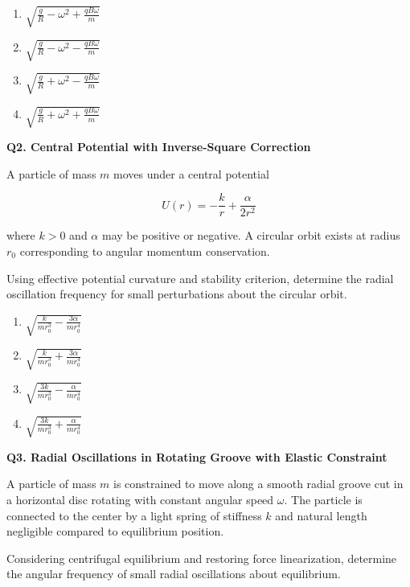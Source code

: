 \documentclass[12pt]{article}
\begin{document}
\begin{enumerate}
\item[(A)] $\sqrt{\frac{g}{R}-\omega^2+\frac{qB\omega}{m}}$
\item[(B)] $\sqrt{\frac{g}{R}-\omega^2-\frac{qB\omega}{m}}$
\item[(C)] $\sqrt{\frac{g}{R}+\omega^2-\frac{qB\omega}{m}}$
\item[(D)] $\sqrt{\frac{g}{R}+\omega^2+\frac{qB\omega}{m}}$
\end{enumerate}


\textbf{Q2. Central Potential with Inverse-Square Correction}

A particle of mass $m$ moves under a central potential  

\[
U(r)= -\frac{k}{r} + \frac{\alpha}{2r^2}
\]

where $k>0$ and $\alpha$ may be positive or negative. A circular orbit exists at radius $r_0$ corresponding to angular momentum conservation.  

Using effective potential curvature and stability criterion, determine the radial oscillation frequency for small perturbations about the circular orbit.

\begin{enumerate}
\item[(A)] $\sqrt{\frac{k}{mr_0^3}-\frac{3\alpha}{mr_0^4}}$
\item[(B)] $\sqrt{\frac{k}{mr_0^3}+\frac{3\alpha}{mr_0^4}}$
\item[(C)] $\sqrt{\frac{3k}{mr_0^3}-\frac{\alpha}{mr_0^4}}$
\item[(D)] $\sqrt{\frac{3k}{mr_0^3}+\frac{\alpha}{mr_0^4}}$
\end{enumerate}


\textbf{Q3. Radial Oscillations in Rotating Groove with Elastic Constraint}

A particle of mass $m$ is constrained to move along a smooth radial groove cut in a horizontal disc rotating with constant angular speed $\omega$. The particle is connected to the center by a light spring of stiffness $k$ and natural length negligible compared to equilibrium position.  

Considering centrifugal equilibrium and restoring force linearization, determine the angular frequency of small radial oscillations about equilibrium.
\end{document}
